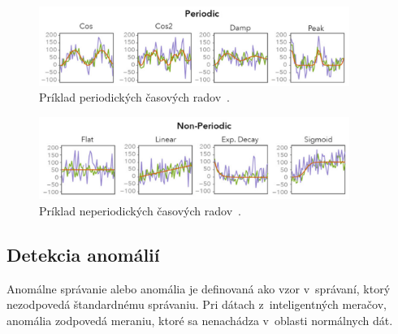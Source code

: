 \documentclass[a4paper,twoside,slovak,12pt,appendix]{article}
\begin{document}
\begin{figure}[H]
  \centering
  \includegraphics[width=0.9\textwidth]{periodic_time_series.png}
  \caption[Príklad periodických časových radov.]{Príklad periodických časových radov~\cite{Perea2015}.}
  \label{fig:periodic-time-series}
\end{figure}

\begin{figure}[H]
  \centering
  \includegraphics[width=0.9\textwidth]{non_periodic_time_series.png}
  \caption[Príklad neperiodických časových radov.]{Príklad neperiodických časových radov~\cite{Perea2015}.}
  \label{fig:non-periodic-time-series}
\end{figure}


\subsection{Detekcia anomálií}
Anomálne správanie alebo anomália je definovaná ako vzor v~správaní, ktorý
nezodpovedá štandardnému správaniu. Pri dátach z~inteligentných meračov,
anomália zodpovedá meraniu, ktoré sa nenachádza v~oblasti normálnych dát.
\end{document}
